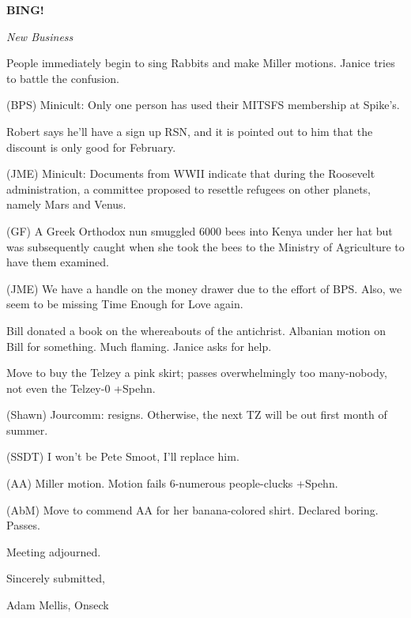 \documentclass[12pt]{article}
\newcommand{\bing}{{\bf BING!} }
\newcommand{\goto}[1]{\bing \vskip 12pt \centerline{{\em{#1}}}}
\begin{document}
\goto{New Business}

People immediately begin to sing Rabbits and make Miller motions. Janice tries to battle the confusion.

(BPS) Minicult: Only one person has used their MITSFS membership at Spike's.

Robert says he'll have a sign up RSN, and it is pointed out to him that the discount is only good for February.

(JME) Minicult: Documents from WWII indicate that during the Roosevelt administration, a committee proposed to resettle refugees on other planets, namely Mars and Venus.

(GF) A Greek Orthodox nun smuggled 6000 bees into Kenya under her hat but was subsequently caught when she took the bees to the Ministry of Agriculture to have them examined.

(JME) We have a handle on the money drawer due to the effort of BPS. Also, we seem to be missing Time Enough for Love again.

Bill donated a book on the whereabouts of the antichrist. Albanian motion on Bill for something. Much flaming. Janice asks for help.

Move to buy the Telzey a pink skirt; passes overwhelmingly too many-nobody, not even the Telzey-0 +Spehn.

(Shawn) Jourcomm: resigns. Otherwise, the next TZ will be out first month of summer.

(SSDT) I won't be Pete Smoot, I'll replace him.

(AA) Miller motion. Motion fails 6-numerous people-clucks +Spehn.

(AbM) Move to commend AA for her banana-colored shirt. Declared boring. Passes.

\vspace{12pt}

\noindent
Meeting adjourned.

\vspace{18pt}

\centerline{Sincerely submitted,}
\centerline{Adam Mellis, Onseck}
\end{document}
